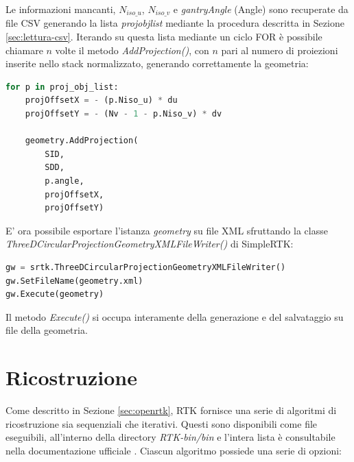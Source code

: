 \documentclass[a4paper,12pt, doubleside]{report}
\begin{document}
                Le informazioni mancanti, $N_{iso\_u}$, $N_{iso\_v}$ e \textit{gantryAngle} (Angle) sono recuperate da file CSV generando la lista \textit{proj\textunderscore obj\textunderscore list} mediante la procedura descritta in Sezione \ref{sec:lettura-csv}. Iterando su questa lista mediante un ciclo FOR è possibile chiamare $n$ volte il metodo \textit{AddProjection()}, con $n$ pari al numero di proiezioni inserite nello stack normalizzato, generando correttamente la geometria:
                    
                \begin{lstlisting}[language=python, frame=bt]
for p in proj_obj_list: 
    projOffsetX = - (p.Niso_u) * du
    projOffsetY = - (Nv - 1 - p.Niso_v) * dv

    geometry.AddProjection(
        SID,
        SDD,
        p.angle,
        projOffsetX,
        projOffsetY)
                \end{lstlisting}
                    
                E' ora possibile esportare l'istanza \textit{geometry} su file XML sfruttando la classe \textit{ThreeDCircularProjectionGeometryXMLFileWriter()} di SimpleRTK:
                    
                \begin{lstlisting}[language=python, frame=bt]
gw = srtk.ThreeDCircularProjectionGeometryXMLFileWriter()
gw.SetFileName(geometry.xml)
gw.Execute(geometry)
                \end{lstlisting}
       
                Il metodo \textit{Execute()} si occupa interamente della generazione e del salvataggio su file della geometria.
                    
            
        \section{Ricostruzione}
        \label{sec:ricostruzione}
            \par
                Come descritto in Sezione \ref{sec:openrtk}, RTK fornisce una serie di algoritmi di ricostruzione sia sequenziali che iterativi. Questi sono disponibili come file eseguibili, all'interno della directory \textit{RTK-bin/bin} e l'intera lista è consultabile nella documentazione ufficiale \cite{rtk-recon-list}. Ciascun algoritmo possiede una serie di opzioni:
                
\end{document}
